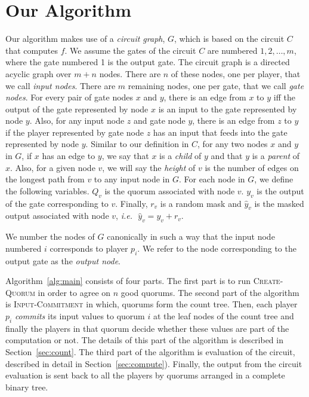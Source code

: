 \documentclass[10pt]{llncs}
\newcommand{\ie}{\emph{i.e.\,}}
\newcommand{\cq}{\textsc{Create-Quorum}\xspace}
\newcommand{\ic}{\textsc{Input-Commitment}\xspace}
\newcommand{\outnode}{output node}
\newcommand{\ct}{count tree\xspace}
\begin{document}
\section{Our Algorithm} \label{sec:alg}
Our algorithm makes use of a \emph{circuit graph}, $G$, which is based
on the circuit $C$ that computes $f$. We assume the gates of the
circuit $C$ are numbered $1, 2, \dots, m$, where the gate numbered 1
is the output gate. The circuit graph is a directed acyclic graph over
$m+n$ nodes.  There are $n$ of these nodes, one per player, that we
call \emph{input nodes}.  There are $m$ remaining nodes, one per gate,
that we call \emph{gate nodes}. For every pair of gate nodes $x$ and
$y$, there is an edge from $x$ to $y$ iff the output of the gate
represented by node $x$ is an input to the gate represented by node
$y$.  Also, for any input node $z$ and gate node $y$, there is an edge
from $z$ to $y$ if the player represented by gate node $z$ has an
input that feeds into the gate represented by node $y$. Similar to our
definition in $C$, for any two nodes $x$ and $y$ in $G$, if $x$ has an
edge to $y$, we say that $x$ is a \emph{child} of $y$ and that $y$ is
a \emph{parent} of $x$.  Also, for a given node $v$, we will say the
\emph{height} of $v$ is the number of edges on the longest path from
$v$ to any input node in $G$. For each node in $G$, we define the following variables. $Q_v$ is the quorum associated with node $v$. $y_v$ is the output of the gate corresponding to $v$. Finally, $r_v$ is a random mask and $\hat y_v$ is the masked output associated with node $v$, \ie ~$\hat y_v = y_v + r_v$.

We number the nodes of $G$ canonically in such a way that the input node numbered $i$
corresponds to player $p_i$. We refer to the node corresponding to the
output gate as the \emph{\outnode}.

Algorithm~\ref{alg:main} consists of four parts. The first part is to
run \cq in order to agree on $n$ good quorums. The second part of the
algorithm is \ic in which, quorums form the \ct. Then, each player
$p_i$ \emph{commits} its input values to quorum $i$ at the leaf nodes
of the \ct and finally the players in that quorum decide whether these
values are part of the computation or not. The details of this part of
the algorithm is described in Section~\ref{sec:count}. The third part
of the algorithm is evaluation of the circuit, described in detail in
Section~\ref{sec:compute}). Finally, the output from the circuit
evaluation is sent back to all the players by quorums arranged in a complete 
binary tree.
\end{document}
